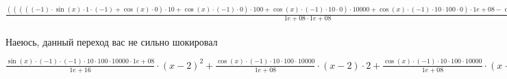 \documentclass[a4paper, 12pt] {article}
\begin{document}
\begin{math}
 \frac {(((((-1) \cdot  \sin (x) \cdot 1 \cdot (-1)+ \cos (x) \cdot 0) \cdot 10+ \cos (x) \cdot (-1) \cdot 0) \cdot 100+ \cos (x) \cdot (-1) \cdot 10 \cdot 0) \cdot 10000+ \cos (x) \cdot (-1) \cdot 10 \cdot 100 \cdot 0) \cdot 1e+08- \cos (x) \cdot (-1) \cdot 10 \cdot 100 \cdot 10000 \cdot 0}{1e+08 \cdot 1e+08} \cdot (x-2)^{2}+ \frac { \cos (x) \cdot (-1) \cdot 10 \cdot 100 \cdot 10000}{1e+08} \cdot 2 \cdot (x-2)^{1} \cdot (1-0)+ \frac {((( \cos (x) \cdot 1 \cdot (-1)+ \sin (x) \cdot 0) \cdot 10+ \sin (x) \cdot (-1) \cdot 0) \cdot 100+ \sin (x) \cdot (-1) \cdot 10 \cdot 0) \cdot 10000- \sin (x) \cdot (-1) \cdot 10 \cdot 100 \cdot 0}{10000 \cdot 10000} \cdot (x-2) \cdot 2+ \frac { \sin (x) \cdot (-1) \cdot 10 \cdot 100}{10000} \cdot ((1-0) \cdot 2+(x-2) \cdot 0)+ \frac {((( \cos (x) \cdot 1 \cdot (-1)+ \sin (x) \cdot 0) \cdot 10+ \sin (x) \cdot (-1) \cdot 0) \cdot 100+ \sin (x) \cdot (-1) \cdot 10 \cdot 0) \cdot 10000- \sin (x) \cdot (-1) \cdot 10 \cdot 100 \cdot 0}{10000 \cdot 10000} \cdot (x-2) \cdot 2+ \frac { \sin (x) \cdot (-1) \cdot 10 \cdot 100}{10000} \cdot ((1-0) \cdot 2+(x-2) \cdot 0)+ \frac {((-1) \cdot  \sin (x) \cdot 1 \cdot 10+ \cos (x) \cdot 0) \cdot 100- \cos (x) \cdot 10 \cdot 0}{100 \cdot 100} \cdot 2+ \frac { \cos (x) \cdot 10}{100} \cdot 0+ \frac {((( \cos (x) \cdot 1 \cdot (-1)+ \sin (x) \cdot 0) \cdot 10+ \sin (x) \cdot (-1) \cdot 0) \cdot 100+ \sin (x) \cdot (-1) \cdot 10 \cdot 0) \cdot 10000- \sin (x) \cdot (-1) \cdot 10 \cdot 100 \cdot 0}{10000 \cdot 10000} \cdot (x-2) \cdot 2+ \frac { \sin (x) \cdot (-1) \cdot 10 \cdot 100}{10000} \cdot ((1-0) \cdot 2+(x-2) \cdot 0)+ \frac {((-1) \cdot  \sin (x) \cdot 1 \cdot 10+ \cos (x) \cdot 0) \cdot 100- \cos (x) \cdot 10 \cdot 0}{100 \cdot 100} \cdot 2+ \frac { \cos (x) \cdot 10}{100} \cdot 0+ \frac {((-1) \cdot  \sin (x) \cdot 1 \cdot 10+ \cos (x) \cdot 0) \cdot 100- \cos (x) \cdot 10 \cdot 0}{100 \cdot 100} \cdot 2+ \frac { \cos (x) \cdot 10}{100} \cdot 0
\end{math}
\\
\\
Наеюсь, данный переход вас не сильно шокировал

\begin{math}
 \frac { \sin (x) \cdot (-1) \cdot (-1) \cdot 10 \cdot 100 \cdot 10000 \cdot 1e+08}{1e+16} \cdot (x-2)^{2}+ \frac { \cos (x) \cdot (-1) \cdot 10 \cdot 100 \cdot 10000}{1e+08} \cdot (x-2) \cdot 2+ \frac { \cos (x) \cdot (-1) \cdot 10 \cdot 100 \cdot 10000}{1e+08} \cdot (x-2) \cdot 2+ \frac { \sin (x) \cdot (-1) \cdot 10 \cdot 100}{10000} \cdot 2+ \frac { \cos (x) \cdot (-1) \cdot 10 \cdot 100 \cdot 10000}{1e+08} \cdot (x-2) \cdot 2+ \frac { \sin (x) \cdot (-1) \cdot 10 \cdot 100}{10000} \cdot 2+ \frac { \sin (x) \cdot (-1) \cdot 10 \cdot 100}{10000} \cdot 2+ \frac { \cos (x) \cdot (-1) \cdot 10 \cdot 100 \cdot 10000}{1e+08} \cdot (x-2) \cdot 2+ \frac { \sin (x) \cdot (-1) \cdot 10 \cdot 100}{10000} \cdot 2+ \frac { \sin (x) \cdot (-1) \cdot 10 \cdot 100}{10000} \cdot 2+ \frac { \sin (x) \cdot (-1) \cdot 10 \cdot 100}{10000} \cdot 2
\end{math}
\\
\\
\end{document}
